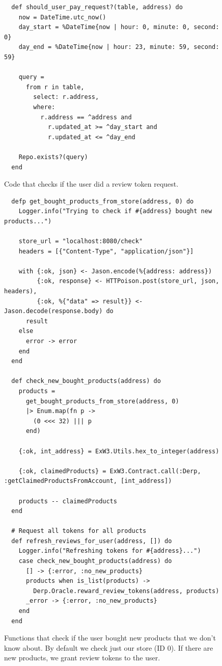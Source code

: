 \documentclass[12pt,a4paper,oneside]{article}
\theoremstyle{definition}
\begin{document}
\begin{figure}[H]
	\begin{verbatim}
  def should_user_pay_request?(table, address) do
    now = DateTime.utc_now()
    day_start = %DateTime{now | hour: 0, minute: 0, second: 0}
    day_end = %DateTime{now | hour: 23, minute: 59, second: 59}

    query =
      from r in table,
        select: r.address,
        where:
          r.address == ^address and
            r.updated_at >= ^day_start and
            r.updated_at <= ^day_end

    Repo.exists?(query)
  end
    \end{verbatim}
	\label{code:request-check}
	\caption{Code that checks if the user did a review token request.}
\end{figure}


\begin{figure}[H]
	\begin{verbatim}
  defp get_bought_products_from_store(address, 0) do
    Logger.info("Trying to check if #{address} bought new products...")

    store_url = "localhost:8080/check"
    headers = [{"Content-Type", "application/json"}]

    with {:ok, json} <- Jason.encode(%{address: address})
         {:ok, response} <- HTTPoison.post(store_url, json, headers),
         {:ok, %{"data" => result}} <- Jason.decode(response.body) do
      result
    else
      error -> error
    end 
  end

  def check_new_bought_products(address) do
    products =
      get_bought_products_from_store(address, 0)
      |> Enum.map(fn p -> 
        (0 <<< 32) ||| p
      end)

    {:ok, int_address} = ExW3.Utils.hex_to_integer(address)

    {:ok, claimedProducts} = ExW3.Contract.call(:Derp, :getClaimedProductsFromAccount, [int_address])

    products -- claimedProducts
  end

  # Request all tokens for all products
  def refresh_reviews_for_user(address, []) do
    Logger.info("Refreshing tokens for #{address}...")
    case check_new_bought_products(address) do
      [] -> {:error, :no_new_products}
      products when is_list(products) ->
        Derp.Oracle.reward_review_tokens(address, products)
      _error -> {:error, :no_new_products}
    end
  end
    \end{verbatim}
	\label{code:new-products-check}
	\caption{Functions that check if the user bought new products that we don't know about. By default we check just our store (ID 0). If there are new products, we grant review tokens to the user.}
\end{figure}
\end{document}
